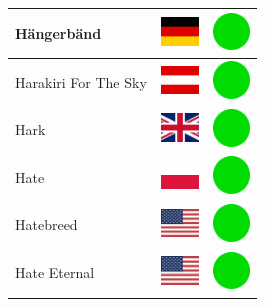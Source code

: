 \documentclass[12pt, a4paper, twoside]{report}
\begin{document}
\begin{center}
\begin{longtable}{|p{5cm}|p{2cm}|p{2cm}|}
Hängerbänd & \includegraphics[width=1cm]{4x3/de} & \includegraphics[width=1cm]{likes/y} \\ \hline
Harakiri For The Sky & \includegraphics[width=1cm]{4x3/at} & \includegraphics[width=1cm]{likes/y} \\ \hline
Hark & \includegraphics[width=1cm]{4x3/gb} & \includegraphics[width=1cm]{likes/y} \\ \hline
Hate & \includegraphics[width=1cm]{4x3/pl} & \includegraphics[width=1cm]{likes/y} \\ \hline
Hatebreed & \includegraphics[width=1cm]{4x3/us} & \includegraphics[width=1cm]{likes/y} \\ \hline
Hate Eternal & \includegraphics[width=1cm]{4x3/us} & \includegraphics[width=1cm]{likes/y} \\ \hline

\end{longtable}
\end{center}
\end{document}
